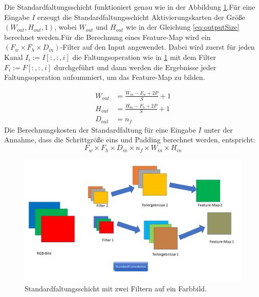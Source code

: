 \documentclass[12pt,a4paper]{scrartcl}
\numberwithin{equation}{section}
\begin{document}
Die Standardfaltungsschicht funktioniert genau wie in der Abbildung \ref{fig:Standardfaltung}.Für eine Eingabe $ I $ erzeugt die Standardfaltungsschicht Aktivierungskarten der Größe $(W_{out},H_{out}, 1) $, wobei $W_{out} $ und $H_{out} $ wie in der Gleichung \ref{eq:outputSize} berechnet werden.Für die Berechnung eines Feature-Map wird ein $ (F_w\times F_h\times D_{in}) $-Filter auf den Input angewendet. Dabei wird zuerst für jeden Kanal $ I_i :=I[:,:, i]$ die Faltungsoperation wie in \ref{fig:Standardfaltung} mit dem Filter $ F_i := F[:,:,i] $ durchgeführt und dann werden die Ergebnisse jeder Faltungsoperation aufsummiert, um das Feature-Map zu bilden.

\begin{equation}\label{eq:outputSize}
	 \begin{split}
	W_{out} &= \frac{W_{in}-F_w+2P}{S}+1\\
	H_{out} &= \frac{H_{in}-F_h+2P}{S}+1\\
	D_{out} &= n_f 
	\end{split} 
\end{equation}
Die Berechnungskosten der Standardfaltung für eine Eingabe $ I $ unter der Annahme, dass die Schrittgröße eins und Padding berechnet werden, entspricht:
\begin{equation}\label{eq:SF_kost}
	F_w\times F_h \times D_{in}\times n_f \times W_{in}\times H_{in}
\end{equation}
\begin{figure}[h]
	\includegraphics[width=\textwidth]{Convolution/Folie1}
	\caption{Standardfaltungsschicht mit zwei Filtern auf ein Farbbild.}
	\label{fig:Standardfaltung}
\end{figure}
\end{document}
